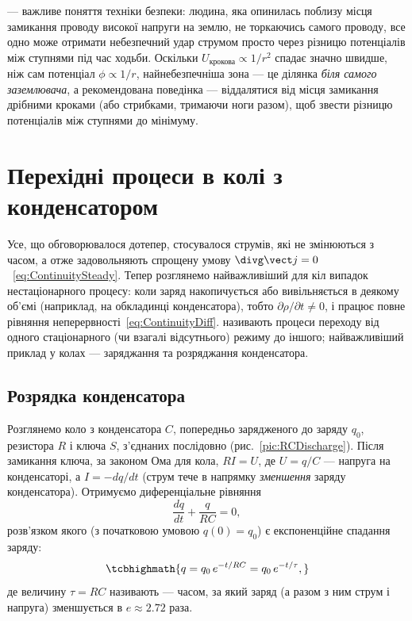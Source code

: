 \begin{Attention}
	 --- важливе поняття техніки безпеки: людина, яка опинилась поблизу місця замикання проводу високої напруги на землю, не
	торкаючись самого проводу, все одно може отримати небезпечний удар струмом просто через різницю потенціалів між ступнями під час ходьби.
	Оскільки $U_\text{крокова}\propto 1/r^2$ спадає значно швидше, ніж сам потенціал $\phi\propto 1/r$, найнебезпечніша зона --- це ділянка \emph{біля
		самого заземлювача}, а рекомендована поведінка --- віддалятися від місця замикання дрібними кроками (або стрибками, тримаючи ноги разом), щоб
	звести різницю потенціалів між ступнями до мінімуму.
\end{Attention}

\section{Перехідні процеси в колі з конденсатором}\hypertarget{capacitor-transient-process}{}

Усе, що обговорювалося дотепер, стосувалося  струмів, які не змінюються з часом, а отже задовольняють спрощену умову $\divg\vect j=0$~\eqref{eq:ContinuitySteady}. Тепер розглянемо найважливіший для кіл випадок нестаціонарного процесу: коли заряд накопичується або вивільняється в деякому об'ємі (наприклад, на обкладинці конденсатора), тобто $\partial\rho/\partial t\neq 0$, і працює повне рівняння неперервності~\eqref{eq:ContinuityDiff}.  називають процеси переходу від одного стаціонарного (чи взагалі відсутнього) режиму до іншого; найважливіший приклад у колах --- заряджання та розряджання конденсатора.


\subsection*{Розрядка конденсатора}

Розглянемо коло з конденсатора $C$, попередньо зарядженого до заряду $q_0$, резистора $R$ і ключа $S$, з'єднаних послідовно
(рис.~\ref{pic:RCDischarge}). Після замикання ключа, за законом Ома для кола, $RI = U$, де $U = q/C$ --- напруга на конденсаторі, а
$I = -dq/dt$ (струм тече в напрямку \emph{зменшення} заряду конденсатора). Отримуємо диференціальне рівняння
\begin{equation}\label{eq:RCDischarge}
	\frac{dq}{dt} + \frac{q}{RC} = 0,
\end{equation}
розв'язком якого (з початковою умовою $q(0)=q_0$) є експоненційне спадання заряду:
\begin{equation}\label{eq:RCDischargeSolution}
	\tcbhighmath{
		q = q_0\, e^{-t/RC} = q_0\, e^{-t/\tau},
	}
\end{equation}
де величину $\tau = RC$ називають  --- часом, за який заряд (а разом з ним струм і напруга) зменшується в $e\approx 2.72$
раза.

